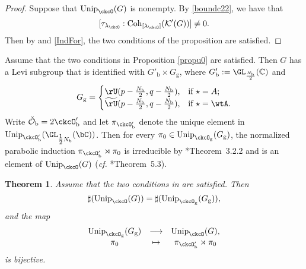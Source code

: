 \documentclass[12pt,a4paper]{amsart}
\newcommand{\CK}{{\mathcal {K}}}
\newcommand{\CO}{{\mathcal {O}}}
\newcommand{\be}{\begin {equation}}
\newcommand{\ee}{\end {equation}}
\numberwithin{equation}{section}
\newtheorem{thm}{Theorem}[section]
\theoremstyle{remark}
\def\half{{\tfrac{1}{2}}}
\def\cf{\emph{cf.} }
\def\Unip{\mathrm{Unip}}
\def\lamck{\lambda_\ckcO}
\def\Cint#1{\Coh_{[#1]}}
\def\LC{{}^{\scriptscriptstyle L}\sC}
\def\tU{\widetilde{\rU}}
\def\Coh{\mathrm{Coh}}
\def\ckcOpb{\ckcO'_{\mathrm b}}
\def\Gg{G_{\mathrm g}}
\begin{document}
\begin{proof} 
  Suppose that  $\Unip_{\ckcO}(G)$ is nonempty. By \eqref{boundc22}, we have that
  \[
  [\tau_{\lamck}:\Cint{\lamck}(\CK'(G))]\ne 0.
  \]
  Then  by  and \eqref{IndFor}, the two conditions of the proposition are satisfied.  
  \end{proof}

Assume that the two conditions in Proposition \ref{propu0} are satisfied. Then $G$ has a Levi subgroup that is identified with $G'_{\mathrm b}\times G_{\mathrm g}$, where 
$G'_{\mathrm b}:=\GL_{\frac{N_{\mathrm b}}{2}}(\C)$ and 
\[
  G_{\mathrm g} =
  \begin{cases}
    \rU(p-\frac{N_{\mathrm b}}{2},q-\frac{N_{\mathrm b}}{2}),  & \text{if }\star = A;\\
    \tU(p-\frac{N_{\mathrm b}}{2},q-\frac{N_{\mathrm b}}{2}),  & \text{if }\star = \wtA.
\end{cases}
\]
Write $\check \CO_{\mathrm b}=2 \ckcOpb$ and let $\pi_{\ckcOpb}$ denote the
unique element in $\Unip_{\ckcOpb}(\GL_{\half N_{\mathrm b}}(\bC))$. Then for
every $\pi_0\in \Unip_{\ckcO_{\mathrm g}}(\Gg)$, the normalized parabolic
induction $\pi_{\ckcOpb}\rtimes \pi_{0}$ is irreducible by
\cite{Mat96}*{Theorem~3.2.2} and is an element of $\Unip_{\ckcO}(G)$ (\cf
\cite{MR.U}*{Theorem~5.3}).

\begin{thm}
  Assume that the two conditions in  are satisfied.
  Then
  \begin{equation}\label{unitarred1}
    \sharp(\Unip_{\ckcO}(G)) =
    \sharp(\Unip_{\ckcO_{\mathrm g}}(\Gg)),
  \end{equation}
  and
  the map
  \be\label{bij00}
    \begin{array}{ccc}
      \Unip_{\ckcO_{\mathrm g}}(\Gg)&\longrightarrow &\Unip_{\ckcO}(G),\\
      \pi_{0}& \mapsto & \pi_{\ckcOpb}\rtimes \pi_{0} \\
    \end{array}
  \ee
  is bijective. %
\end{thm}
\end{document}
